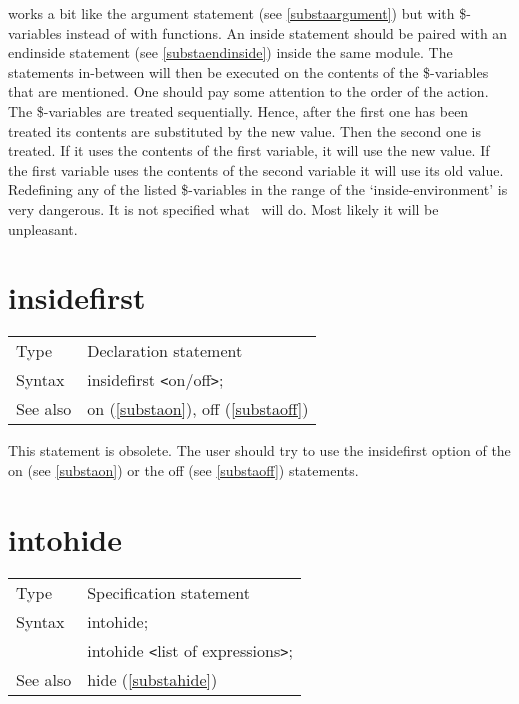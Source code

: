 \noindent works a bit like the argument 
statement (see \ref{substaargument}) but with 
\$-variables instead of with functions. An inside 
statement should be paired with an endinside statement 
(see \ref{substaendinside}) inside the same module. The statements 
in-between will then be executed on the contents of the \$-variables that 
are mentioned. One should pay some attention to the order of the action. 
The \$-variables are treated sequentially. Hence, after the first one has 
been treated its contents are substituted by the new value. Then the second 
one is treated. If it uses the contents of the first variable, it will use 
the new value. If the first variable uses the contents of the second 
variable it will use its old value. Redefining any of the listed 
\$-variables in the range of the `inside-environment' is very dangerous. It 
is not specified what \FORM\ will do. Most likely it will be 
unpleasant. 
\vspace{10mm}


\section{insidefirst}
\label{substainsidefirst}

\noindent \begin{tabular}{ll}
Type & Declaration statement\\
Syntax & insidefirst {\tt<}on/off{\tt>};
\\ See also & on (\ref{substaon}), off (\ref{substaoff})
\end{tabular} \vspace{4mm}

\noindent This statement is obsolete. 
The user should try to use the insidefirst option of the on (see 
\ref{substaon}) or the off (see \ref{substaoff}) statements. \vspace{10mm}


\section{intohide}
\label{substaintohide}

\noindent \begin{tabular}{ll}
Type & Specification statement\\
Syntax & intohide; \\
       & intohide {\tt<}list of expressions{\tt>};
\\ See also & hide (\ref{substahide})
\end{tabular} \vspace{4mm}

